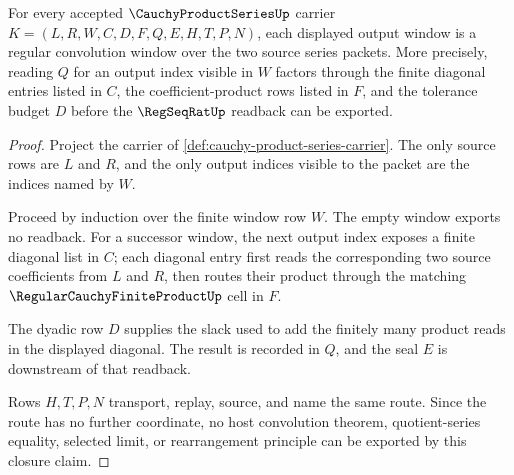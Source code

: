 \begin{theorem}
\label{thm:cauchy-product-series-regular-convolution}
For every accepted $\CauchyProductSeriesUp$ carrier $K=(L,R,W,C,D,F,Q,E,H,T,P,N)$, each displayed output window is a regular convolution window over the two source series packets. More precisely, reading $Q$ for an output index visible in $W$ factors through the finite diagonal entries listed in $C$, the coefficient-product rows listed in $F$, and the tolerance budget $D$ before the $\RegSeqRatUp$ readback can be exported.
\end{theorem}
\begin{proof}
Project the carrier of \autoref{def:cauchy-product-series-carrier}. The only source rows are $L$ and $R$, and the only output indices visible to the packet are the indices named by $W$.

Proceed by induction over the finite window row $W$. The empty window exports no readback. For a successor window, the next output index exposes a finite diagonal list in $C$; each diagonal entry first reads the corresponding two source coefficients from $L$ and $R$, then routes their product through the matching $\RegularCauchyFiniteProductUp$ cell in $F$.

The dyadic row $D$ supplies the slack used to add the finitely many product reads in the displayed diagonal. The result is recorded in $Q$, and the seal $E$ is downstream of that readback.

Rows $H,T,P,N$ transport, replay, source, and name the same route. Since the route has no further coordinate, no host convolution theorem, quotient-series equality, selected limit, or rearrangement principle can be exported by this closure claim.
\end{proof}

